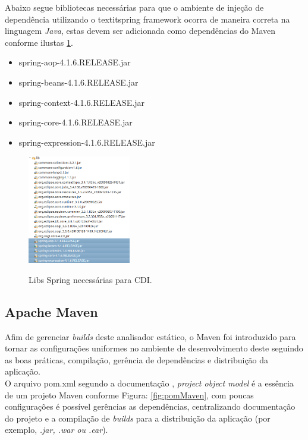 Abaixo segue bibliotecas necessárias para que o ambiente de injeção de dependência utilizando o textit{spring framework} \cite{SPRING_REF} ocorra de maneira correta na linguagem \textit{Java}, estas devem ser adicionada como dependências do Maven conforme ilustas \ref{fig:libsCDI}.
\begin{itemize}
	\item spring-aop-4.1.6.RELEASE.jar
	\item spring-beans-4.1.6.RELEASE.jar
	\item spring-context-4.1.6.RELEASE.jar
	\item spring-core-4.1.6.RELEASE.jar
	\item spring-expression-4.1.6.RELEASE.jar
\end{itemize}
\clearpage

\begin{figure}[h]
	\center
	\includegraphics[width=0.4\textwidth]{Imagens/libsSpring}
	\label{fig:libsCDI}
	\caption{Libs Spring necessárias para CDI.}
\end{figure}



\clearpage
\subsection{Apache Maven}
Afim de gerenciar \textit{builds} deste analisador estático, o Maven foi introduzido para tornar as configurações uniformes no ambiente de desenvolvimento deste seguindo as boas práticas, compilação, gerência de dependências e distribuição da aplicação.\\

O arquivo pom.xml segundo a documentação \cite{docMaven}, \textit{project object model} é a essência de um projeto Maven conforme Figura:  \ref{fig:pomMaven}, com poucas configurações é possível gerências as dependências, centralizando documentação do projeto e a compilação de \textit{builds} para a distribuição da aplicação (por exemplo, \textit{.jar, .war ou .ear}).\\


